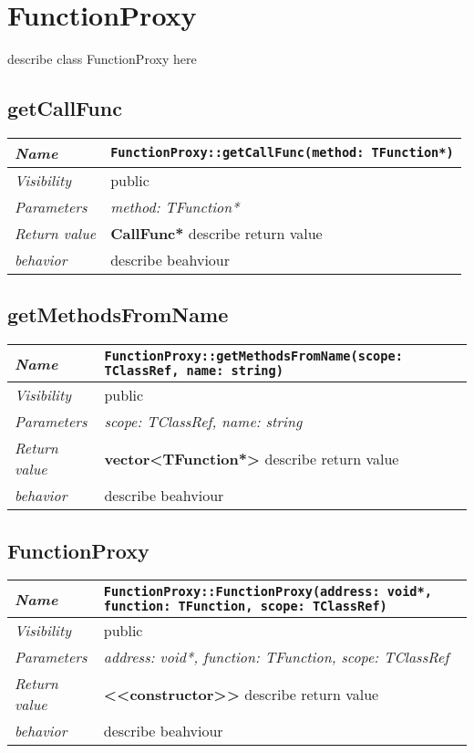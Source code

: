\chapter{FunctionProxy}
describe class FunctionProxy here
\section{getCallFunc}
\begin{longtable}{p{3cm} @{\hskip 1cm} p{12cm}}
 \hline
\textit{Name} & \texttt{FunctionProxy::getCallFunc(method: TFunction*)}\\
\hline
 \textit{Visibility} & public\\
\hline
\textit{Parameters} & \textit{method: TFunction*}\\
\hline
\textit{Return value} & \textbf{ CallFunc*} describe return value\\
  \hline
 \textit{behavior} & describe beahviour \\
\hline
\end{longtable} \pagebreak
 \section{getMethodsFromName}
\begin{longtable}{p{3cm} @{\hskip 1cm} p{12cm}}
 \hline
\textit{Name} & \texttt{FunctionProxy::getMethodsFromName(scope: TClassRef, name: string)}\\
\hline
 \textit{Visibility} & public\\
\hline
\textit{Parameters} & \textit{scope: TClassRef, name: string}\\
\hline
\textit{Return value} & \textbf{ vector<TFunction*>} describe return value\\
  \hline
 \textit{behavior} & describe beahviour \\
\hline
\end{longtable} \pagebreak
 \section{FunctionProxy}
\begin{longtable}{p{3cm} @{\hskip 1cm} p{12cm}}
 \hline
\textit{Name} & \texttt{FunctionProxy::FunctionProxy(address: void*, function: TFunction, scope: TClassRef)}\\
\hline
 \textit{Visibility} & public\\
\hline
\textit{Parameters} & \textit{address: void*, function: TFunction, scope: TClassRef}\\
\hline
\textit{Return value} & \textbf{ <<constructor>>} describe return value\\
  \hline
 \textit{behavior} & describe beahviour \\
\hline
\end{longtable} \pagebreak
